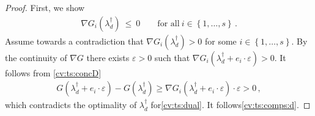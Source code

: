 \begin{proof}
First, we show 
\begin{gather}
  \label{cv:ts:comps:d}
\nabla G_i(\lambda_d^\dagger)
\ 
\le
\ 
0
\qquad
\text{for all}\ 
  i\in \left\{ 1,\ldots, s \right\}
  \,.
\end{gather}
Assume towards a contradiction that 
$
\nabla G_i(\lambda_d^\dagger)>0
$
for some 
$
  i\in \left\{ 1,\ldots, s \right\}
$.
By the continuity of $\nabla G$ there exists $\varepsilon>0$ such that 
$
\nabla G_i(
\lambda_d^\dagger
+
e_i\cdot \varepsilon
)
>
0
$.
It follows from \eqref{cv:ts:concD}
\begin{gather*}
  G
  (
\lambda_d^\dagger
+
e_i\cdot \varepsilon
  )
  -
  G
  (
\lambda_d^\dagger
  )
  \ge
\nabla G_i(
\lambda_d^\dagger
+
e_i\cdot \varepsilon
)
\cdot
\varepsilon
>0
\,,
\end{gather*}
which contradicts the optimality of 
$
\lambda_d^\dagger
$
for\eqref{cv:ts:dual}.
It follows\eqref{cv:ts:comps:d}.
\end{proof}
